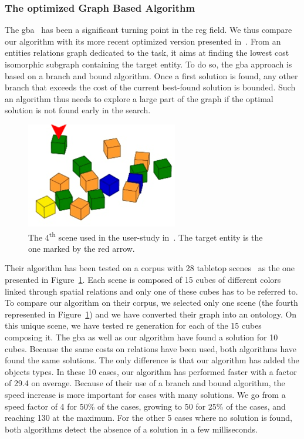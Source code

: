 \subsubsection{The optimized Graph Based Algorithm}

The \acrshort{gba}~\cite{viethen_2013_graphs} has been a significant turning point in the \acrshort{reg} field. We thus compare our algorithm with its more recent optimized version presented in~\cite{li_2017_automatically}. From an entities relations graph dedicated to the task, it aims at finding the lowest cost isomorphic subgraph containing the target entity. To do so, the \acrshort{gba} approach is based on a branch and bound algorithm. Once a first solution is found, any other branch that exceeds the cost of the current best-found solution is bounded. Such an algorithm thus needs to explore a large part of the graph if the optimal solution is not found early in the search.

\begin{figure}[ht!]
\centering
\includegraphics[scale=0.7]{figures/chapter4/GBA.png}
\caption{\label{fig:chap4_gba} The 4\textsuperscript{th} scene used in the user-study in~\cite{li_2016_spatial}. The target entity is the one marked by the red arrow.}
\end{figure}

Their algorithm has been tested on a corpus with 28 tabletop scenes~\cite{li_2016_spatial} as the one presented in Figure~\ref{fig:chap4_gba}. Each scene is composed of 15 cubes of different colors linked through spatial relations and only one of these cubes has to be referred to. To compare our algorithm on their corpus, we selected only one scene (the fourth represented in Figure~\ref{fig:chap4_gba}) and we have converted their graph into an ontology. On this unique scene, we have tested \acrshort{re} generation for each of the 15 cubes composing it. The \acrshort{gba} as well as our algorithm have found a solution for 10 cubes. Because the same costs on relations have been used, both algorithms have found the same solutions. The only difference is that our algorithm has added the objects types. In these 10 cases, our algorithm has performed faster with a factor of 29.4 on average. Because of their use of a branch and bound algorithm, the speed increase is more important for cases with many solutions. We go from a speed factor of 4 for 50\% of the cases, growing to 50 for 25\% of the cases, and reaching 130 at the maximum. For the other 5 cases where no solution is found, both algorithms detect the absence of a solution in a few milliseconds.

